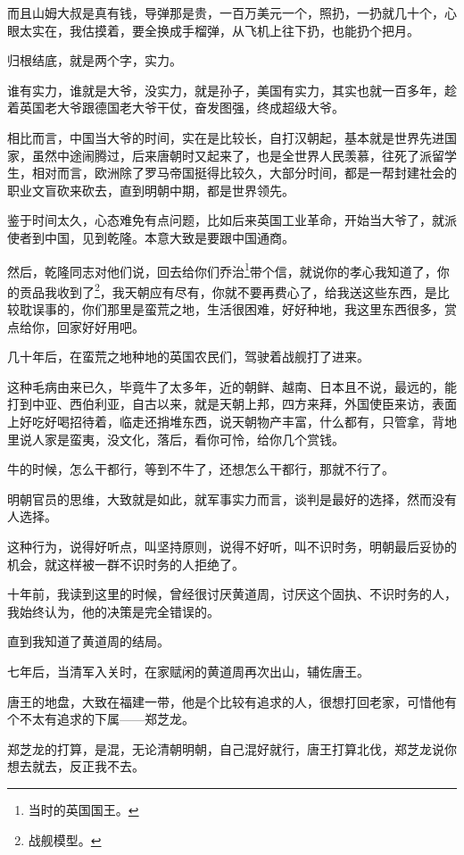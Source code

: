 \begin{multicols}{\theparacolNo}
		而且山姆大叔是真有钱，导弹那是贵，一百万美元一个，照扔，一扔就几十个，心眼太实在，我估摸着，要全换成手榴弹，从飞机上往下扔，也能扔个把月。

		归根结底，就是两个字，实力。

		谁有实力，谁就是大爷，没实力，就是孙子，美国有实力，其实也就一百多年，趁着英国老大爷跟德国老大爷干仗，奋发图强，终成超级大爷。

		相比而言，中国当大爷的时间，实在是比较长，自打汉朝起，基本就是世界先进国家，虽然中途闹腾过，后来唐朝时又起来了，也是全世界人民羡慕，往死了派留学生，相对而言，欧洲除了罗马帝国挺得比较久，大部分时间，都是一帮封建社会的职业文盲砍来砍去，直到明朝中期，都是世界领先。

		鉴于时间太久，心态难免有点问题，比如后来英国工业革命，开始当大爷了，就派使者到中国，见到乾隆。本意大致是要跟中国通商。

		然后，乾隆同志对他们说，回去给你们乔治\footnote{当时的英国国王。}带个信，就说你的孝心我知道了，你的贡品我收到了\footnote{战舰模型。}，我天朝应有尽有，你就不要再费心了，给我送这些东西，是比较耽误事的，你们那里是蛮荒之地，生活很困难，好好种地，我这里东西很多，赏点给你，回家好好用吧。

		几十年后，在蛮荒之地种地的英国农民们，驾驶着战舰打了进来。

		这种毛病由来已久，毕竟牛了太多年，近的朝鲜、越南、日本且不说，最远的，能打到中亚、西伯利亚，自古以来，就是天朝上邦，四方来拜，外国使臣来访，表面上好吃好喝招待着，临走还捎堆东西，说天朝物产丰富，什么都有，只管拿，背地里说人家是蛮夷，没文化，落后，看你可怜，给你几个赏钱。

		牛的时候，怎么干都行，等到不牛了，还想怎么干都行，那就不行了。

		明朝官员的思维，大致就是如此，就军事实力而言，谈判是最好的选择，然而没有人选择。

		这种行为，说得好听点，叫坚持原则，说得不好听，叫不识时务，明朝最后妥协的机会，就这样被一群不识时务的人拒绝了。

		十年前，我读到这里的时候，曾经很讨厌黄道周，讨厌这个固执、不识时务的人，我始终认为，他的决策是完全错误的。

		直到我知道了黄道周的结局。

		七年后，当清军入关时，在家赋闲的黄道周再次出山，辅佐唐王。

		唐王的地盘，大致在福建一带，他是个比较有追求的人，很想打回老家，可惜他有个不太有追求的下属——郑芝龙。

		郑芝龙的打算，是混，无论清朝明朝，自己混好就行，唐王打算北伐，郑芝龙说你想去就去，反正我不去。


\end{multicols}
